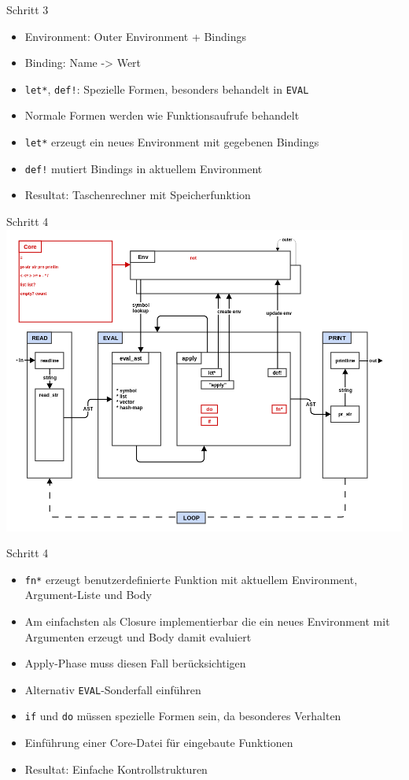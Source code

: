 \documentclass[presentation]{beamer}
\begin{document}
\begin{frame}[fragile,label=sec-3-13]{Schritt 3}
 \begin{itemize}
\item Environment: Outer Environment + Bindings
\item Binding: Name -> Wert
\item \texttt{let*}, \texttt{def!}: Spezielle Formen, besonders behandelt in \texttt{EVAL}
\item Normale Formen werden wie Funktionsaufrufe behandelt
\item \texttt{let*} erzeugt ein neues Environment mit gegebenen Bindings
\item \texttt{def!} mutiert Bindings in aktuellem Environment
\item Resultat: Taschenrechner mit Speicherfunktion
\end{itemize}
\end{frame}

\begin{frame}[label=sec-3-14]{Schritt 4}
\includegraphics[width=.9\linewidth]{./images/step4_if_fn_do.png}
\end{frame}

\begin{frame}[fragile,label=sec-3-15]{Schritt 4}
 \begin{itemize}
\item \texttt{fn*} erzeugt benutzerdefinierte Funktion mit aktuellem Environment,
Argument-Liste und Body
\item Am einfachsten als Closure implementierbar die ein neues Environment
mit Argumenten erzeugt und Body damit evaluiert
\item Apply-Phase muss diesen Fall berücksichtigen
\item Alternativ \texttt{EVAL}-Sonderfall einführen
\item \texttt{if} und \texttt{do} müssen spezielle Formen sein, da besonderes Verhalten
\item Einführung einer Core-Datei für eingebaute Funktionen
\item Resultat: Einfache Kontrollstrukturen
\end{itemize}
\end{frame}
\end{document}

